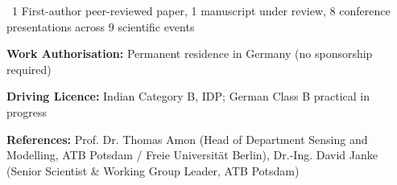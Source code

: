 \documentclass[10pt,a4paper]{article}
\begin{document}
\textbullet\ 1 First-author peer-reviewed paper, 1 manuscript under review, 8 conference presentations across 9 scientific events\par

\textbf{Work Authorisation:} Permanent residence in Germany (no sponsorship required)\par

\textbf{Driving Licence:} Indian Category B, IDP; German Class B practical in progress\par


\textbf{References:} Prof. Dr. Thomas Amon (Head of Department Sensing and Modelling, ATB Potsdam / Freie Universität Berlin), Dr.-Ing. David Janke (Senior Scientist \& Working Group Leader, ATB Potsdam)
\end{document}
